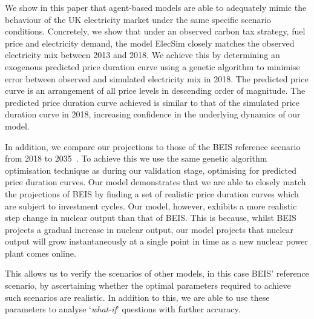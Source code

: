 

We show in this paper that agent-based models are able to adequately mimic the behaviour of the UK electricity market under the same specific scenario conditions. Concretely, we show that under an observed carbon tax strategy, fuel price and electricity demand, the model ElecSim closely matches the observed electricity mix between 2013 and 2018. We achieve this by determining an exogenous predicted price duration curve using a genetic algorithm to minimise error between observed and simulated electricity mix in 2018. The predicted price curve is an arrangement of all price levels in descending order of magnitude. The predicted price duration curve achieved is similar to that of the simulated price duration curve in 2018, increasing confidence in the underlying dynamics of our model. 

In addition, we compare our projections to those of the BEIS reference scenario from 2018 to 2035~\cite{DBEIS2019}. To achieve this we use the same genetic algorithm optimisation technique as during our validation stage, optimising for predicted price duration curves. Our model demonstrates that we are able to closely match the projections of BEIS by finding a set of realistic price duration curves which are subject to investment cycles. Our model, however, exhibits a more realistic step change in nuclear output than that of BEIS. This is because, whilst BEIS projects a gradual increase in nuclear output, our model projects that nuclear output will grow instantaneously at a single point in time as a new nuclear power plant comes online. 

This allows us to verify the scenarios of other models, in this case BEIS' reference scenario, by ascertaining whether the optimal parameters required to achieve such scenarios are realistic. In addition to this, we are able to use these parameters to analyse `\textit{what-if}' questions with further accuracy.





